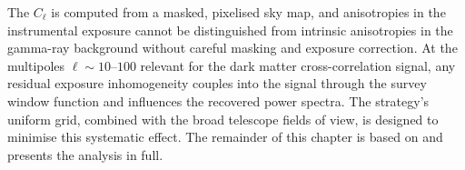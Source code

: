 The \APS $C_\ell$ is computed from a masked, pixelised sky map, and anisotropies in the instrumental exposure cannot be distinguished from intrinsic anisotropies in the gamma-ray background without careful masking and exposure correction.
At the multipoles $\ell \sim 10$--$100$ relevant for the dark matter cross-correlation signal, any residual exposure inhomogeneity couples into the signal through the survey window function and influences the recovered power spectra.
The \EGAL strategy's uniform grid, combined with the broad telescope fields of view, is designed to minimise this systematic effect.
%
The remainder of this chapter is based on \cite{Pinetti:2025hgd} and presents the analysis in full.
